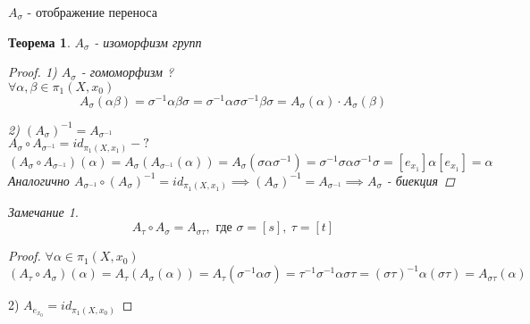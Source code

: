 \documentclass[a4paper]{article}
\newtheorem*{theorem}{Теорема}
\theoremstyle{definition}
\theoremstyle{remark}
\newtheorem*{remark}{Замечание}
\begin{document}
$ A_{\sigma} $ - отображение переноса

\begin{tcolorbox}
    \begin{theorem}
        $ A_{\sigma} $ - изоморфизм групп

        \begin{proof}
            1) $ A_{\sigma} $ - гомоморфизм ?\\
            $ \forall \alpha, \beta \in \pi_1(X, x_0) $ 
            \[
                A_{\sigma}(\alpha \beta) = \sigma^{-1} \alpha \beta \sigma = 
                \sigma^{-1} \alpha \sigma \sigma^{-1} \beta \sigma = A_{\sigma}
                (\alpha) \cdot A_{\sigma}(\beta)
            \]

            2) $ (A_{\sigma})^{-1} = A_{\sigma^{-1}} $\\
            $ A_{\sigma} \circ A_{\sigma^{-1}} = id_{\pi_1(X,x_1)} - ? $ 
            \[
                (A_{\sigma} \circ A_{\sigma^{-1}})(\alpha) = A_{\sigma}
                (A_{\sigma^{-1}}(\alpha)) = A_{\sigma}(\sigma \alpha \sigma^{-1})
                = \sigma^{-1} \sigma \alpha \sigma^{-1} \sigma = [e_{x_1}]
                \alpha[e_{x_1}] = \alpha
            \]
            Аналогично $ A_{\sigma^{-1}} \circ (A_{\sigma})^{-1} = id_{\pi_1(X,x_1)}
            \implies  (A_{\sigma})^{-1} = A_{\sigma^{-1}} \implies A_{\sigma}$ -
            биекция
        \end{proof}
    \end{theorem}
\end{tcolorbox}

\begin{tcolorbox}
    \begin{remark}
        \[
            A_{\tau} \circ A_{\sigma} = A_{\sigma\tau}, \text{ где } \sigma=[s], \
            \tau = [t]
        \]

        \begin{proof}
            $ \forall \alpha \in \pi_1(X, x_0) $ 
            \[
                (A_{\tau} \circ A_{\sigma})(\alpha) = A_{\tau}(A_{\sigma}(\alpha))
                = A_{\tau}(\sigma^{-1} \alpha \sigma) = \tau^{-1} \sigma^{-1}
                \alpha \sigma \tau = (\sigma \tau)^{-1} \alpha (\sigma \tau) =
                A_{\sigma \tau}(\alpha)
            \]

            2) $ A_{e_{x_0}} = id_{\pi_1(X, x_0)} $ 
        \end{proof}
    \end{remark}
\end{tcolorbox}
\end{document}
